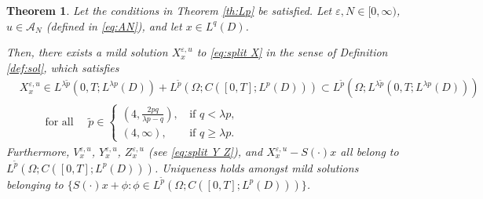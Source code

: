 \documentclass{amsart}
\theoremstyle{plain}
\newtheorem{theorem}{Theorem}[section]
\theoremstyle{remark}
\theoremstyle{plain}
\numberwithin{equation}{section}
\newcommand{\eps}{\varepsilon}
\newcommand{\Om}{\Omega}
\newcommand{\A}{{\mathcal A}}
\begin{document}
\begin{theorem}\label{th:wpnLp}
Let the conditions in Theorem \ref{th:Lp} be satisfied. Let $\eps,N\in[0,\infty)$,   $u\in \A_N$ (defined in \eqref{eq:AN}), and let $x\in L^q(D)$. 

Then, there exists a mild solution $X_x^{\eps,u}$ to \eqref{eq:split X} in the sense of Definition \ref{def:sol}, which  satisfies 
\begin{align*}
&X_x^{\eps,u}\in L^{\lambda \tilde p}(0,T;L^{\lambda p}(D))+ L^{\tilde{p}}(\Omega;C([0,T];L^p(D)))\subset L^{\tilde p}(\Om;L^{\lambda \tilde p}(0,T;L^{\lambda p}(D)))\\
&\qquad\text{ for all }\quad \tilde{p}\in
\begin{cases}
(4,\frac{2pq}{\lambda p-q}), \, &\text{if } q<\lambda p,\\
(4,\infty), &\text{if } q\geq \lambda p. 
\end{cases}
\end{align*}
 Furthermore, $V^{\eps,u}_x$, $Y^{\eps,u}_x$, $Z^{\eps,u}_x$ (see  \eqref{eq:split Y Z}), and $X^{\eps,u}_x -S(\cdot)x$   all belong to  $L^{\tilde{p}}(\Omega;C([0,T];L^p(D)))$.  
 Uniqueness holds amongst mild solutions belonging to $\{S(\cdot)x+\phi:\phi\in L^{\tilde p}(\Om;C([0,T];L^p(D)))\}$. 
\end{theorem}
\end{document}
